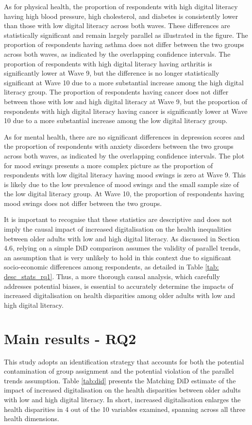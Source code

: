 As for physical health, the proportion of respondents with high digital literacy having high blood pressure, high cholesterol, and diabetes is consistently lower than those with low digital literacy across both waves. These differences are statistically significant and remain largely parallel as illustrated in the figure. The proportion of respondents having asthma does not differ between the two groups across both waves, as indicated by the overlapping confidence intervals. The proportion of respondents with high digital literacy having arthritis is significantly lower at Wave 9, but the difference is no longer statistically significant at Wave 10 due to a more substantial increase among the high digital literacy group. The proportion of respondents having cancer does not differ between those with low and high digital literacy at Wave 9, but the proportion of respondents with high digital literacy having cancer is significantly lower at Wave 10 due to a more substantial increase among the low digital literacy group.

As for mental health, there are no significant differences in depression scores and the proportion of respondents with anxiety disorders between the two groups across both waves, as indicated by the overlapping confidence intervals. The plot for mood swings presents a more complex picture as the proportion of respondents with low digital literacy having mood swings is zero at Wave 9. This is likely due to the low prevalence of mood swings and the small sample size of the low digital literacy group. At Wave 10, the proportion of respondents having mood swings does not differ between the two groups. 

It is important to recognise that these statistics are descriptive and does not imply the causal impact of increased digitalisation on the health inequalities between older adults with low and high digital literacy. As discussed in Section 4.6, relying on a simple DiD comparison assumes the validity of parallel trends, an assumption that is very unlikely to hold in this context due to significant socio-economic differences among respondents, as detailed in Table \ref{tab: desc_stats_rq1}. Thus, a more thorough causal analysis, which carefully addresses potential biases, is essential to accurately determine the impacts of increased digitalisation on health disparities among older adults with low and high digital literacy.

\section{Main results - RQ2}
This study adopts an identification strategy that accounts for both the potential contamination of group assignment and the potential violation of the parallel trends assumption. Table \ref{tab:did} presents the Matching DiD estimate of the impact of increased digitalisation on the health disparities between older adults with low and high digital literacy. In short, increased digitalisation enlarges the health disparities in 4 out of the 10 variables examined, spanning across all three health dimensions. 

